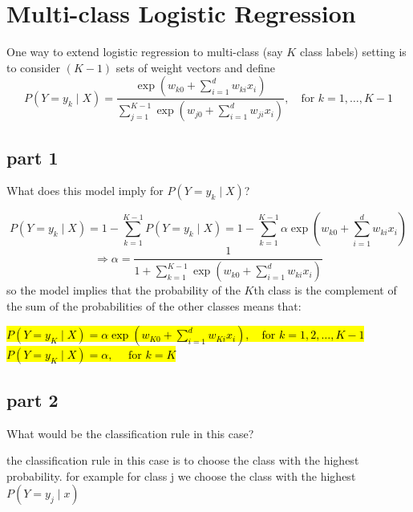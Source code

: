 \section{Multi-class Logistic Regression}

One way to extend logistic regression to multi-class (say $K$ class labels) setting is to consider $(K-1)$ sets of weight vectors and define
\[
P(Y = y_k \mid X) = \frac{\exp \left( w_{k0} + \sum_{i=1}^d w_{ki}x_i \right)}{\sum_{j=1}^{K-1} \exp \left( w_{j0} + \sum_{i=1}^d w_{ji}x_i \right)}, \quad \text{for } k = 1, \ldots, K-1
\]

\subsection{part 1}

What does this model imply for $P(Y = y_k \mid X)$?
\begin{qsolve}
	\begin{qsolve}[]
		$$
		P(Y = y_k \mid X) = 1 - \sum_{k=1}^{K-1} P(Y = y_k \mid X) = 1 - \sum_{k=1}^{K-1} \alpha \exp \left( w_{k0} + \sum_{i=1}^d w_{ki}x_i \right)
		$$
		$$
		\Rightarrow \alpha = \frac{1}{1 + \sum_{k=1}^{K-1} \exp \left( w_{k0} + \sum_{i=1}^d w_{ki}x_i \right)}
		$$
		so the model implies that the probability of the $K$th class is the complement of the sum of the probabilities of the other classes means that:
		\begin{center}
			\hl{$P(Y = y_K \mid X) = \alpha \exp \left( w_{K0} + \sum_{i=1}^d w_{Ki}x_i \right) , \quad \text{for } k = 1,2, \ldots, K-1$}
			\\
			\hl{$P(Y = y_K \mid X) = \alpha,\quad \text{ for } k = K$}
		\end{center}
		
		
	\end{qsolve}
\end{qsolve}
\subsection{part 2}

What would be the classification rule in this case?

\begin{qsolve}
	\begin{qsolve}[]
		the classification rule in this case is to choose the class with the highest probability. for example for class j we choose the class with the highest $P(Y=y_j\mid x)$
	\end{qsolve}
\end{qsolve}

